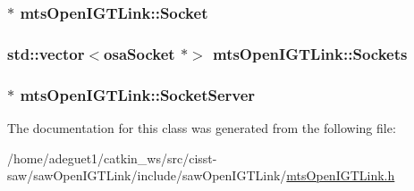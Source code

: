 \hypertarget{classmts_open_i_g_t_link_a92517a30507bb0c5f2717084bf6fcd01}{
\subsubsection[{Socket}]{$\ast$ mts\-Open\-I\-G\-T\-Link\-::\-Socket\hspace{0.3cm}{\ttfamily [protected]}}}\label{classmts_open_i_g_t_link_a92517a30507bb0c5f2717084bf6fcd01}
\hypertarget{classmts_open_i_g_t_link_ac8e7ec9abbd6cb65bbe6a45dd3c4ed80}{
\subsubsection[{Sockets}]{\setlength{\rightskip}{0pt plus 5cm}std\-::vector$<${\bf osa\-Socket} $\ast$$>$ mts\-Open\-I\-G\-T\-Link\-::\-Sockets\hspace{0.3cm}{\ttfamily [protected]}}}\label{classmts_open_i_g_t_link_ac8e7ec9abbd6cb65bbe6a45dd3c4ed80}
\hypertarget{classmts_open_i_g_t_link_adc1f9d5e4dbc18d71552a41d17940893}{
\subsubsection[{Socket\-Server}]{$\ast$ mts\-Open\-I\-G\-T\-Link\-::\-Socket\-Server\hspace{0.3cm}{\ttfamily [protected]}}}\label{classmts_open_i_g_t_link_adc1f9d5e4dbc18d71552a41d17940893}


The documentation for this class was generated from the following file\-:\begin{DoxyCompactItemize}
\item 
/home/adeguet1/catkin\-\_\-ws/src/cisst-\/saw/saw\-Open\-I\-G\-T\-Link/include/saw\-Open\-I\-G\-T\-Link/\hyperlink{mts_open_i_g_t_link_8h}{mts\-Open\-I\-G\-T\-Link.\-h}\end{DoxyCompactItemize}
